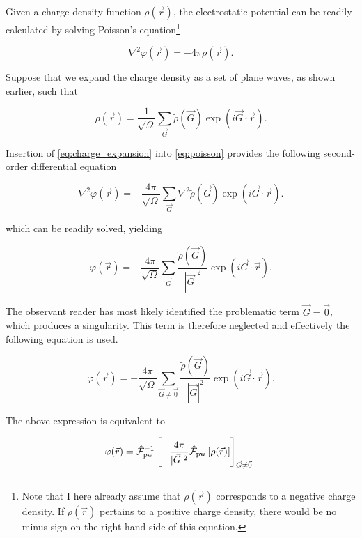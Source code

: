 Given a charge density function $\rho(\vec{r})$, the electrostatic potential can be readily calculated by solving Poisson's equation\footnote{Note that I here already assume that $\rho(\vec{r})$ corresponds to a negative charge density. If $\rho(\vec{r})$ pertains to a positive charge density, there would be no minus sign on the right-hand side of this equation.}

\begin{equation}
    \nabla^{2} \varphi (\vec{r}) = -4\pi\rho(\vec{r}).
    \label{eq:poisson}
\end{equation}

Suppose that we expand the charge density as a set of plane waves, as shown earlier, such that

\begin{equation}
    \rho(\vec{r}) = \frac{1}{\sqrt{\Omega}} \sum_{\vec{G}} \tilde{\rho}(\vec{G}) \exp \left(i \vec{G} \cdot \vec{r} \right).
    \label{eq:charge_expansion}
\end{equation}

Insertion of \cref{eq:charge_expansion} into \cref{eq:poisson} provides the following second-order differential equation

\begin{equation}
    \nabla^{2} \varphi (\vec{r}) = -\frac{4\pi}{\sqrt{\Omega}} \sum_{\vec{G}} \nabla^{2} \tilde{\rho}(\vec{G}) \exp \left(i \vec{G} \cdot \vec{r} \right).
\end{equation}

which can be readily solved, yielding

\begin{equation}
    \varphi (\vec{r}) = -\frac{4\pi}{\sqrt{\Omega}} \sum_{\vec{G}} \frac{\tilde{\rho}(\vec{G})}{|\vec{G}|^{2}} \exp \left(i \vec{G} \cdot \vec{r} \right).
\end{equation}

The observant reader has most likely identified the problematic term $\vec{G} = \vec{0}$, which produces a singularity. This term is therefore neglected and effectively the following equation is used.

\begin{equation}
    \varphi (\vec{r}) = -\frac{4\pi}{\sqrt{\Omega}} \sum_{\vec{G} \neq \vec{0}} \frac{\tilde{\rho}(\vec{G})}{|\vec{G}|^{2}} \exp \left(i \vec{G} \cdot \vec{r} \right).
\end{equation}

The above expression is equivalent to

\begin{equation}
    \varphi (\vec{r}) = \hat{\mathcal{F}}_{\text{pw}}^{-1} \left[-\frac{4 \pi}{|\vec{G}|^{2}} \hat{\mathcal{F}}_{\text{pw}} \left[\rho(\vec{r}) \right] \right]_{\vec{G} \neq \vec{0}}.
    \label{eq:hartree-pot}
\end{equation}

